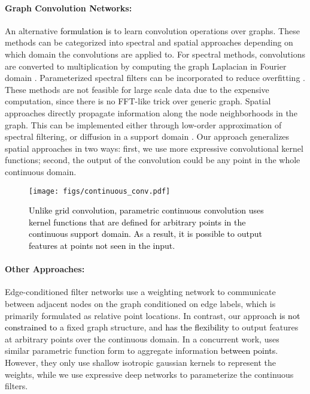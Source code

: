 \documentclass[10pt,twocolumn,letterpaper]{article}
\newcommand\shenlong[1]{\textcolor{black}{#1}}
\newcommand\simon[1]{\textcolor{black}{#1}}
\begin{document}
\paragraph{Graph Convolution Networks:} An alternative \simon{formulation is} to learn convolution operations over graphs.  These methods  can be categorized into spectral  and spatial approaches depending on which domain the convolutions are applied to.  For spectral methods, convolutions are converted to multiplication by computing the  graph Laplacian in Fourier domain \cite{spectralnn, anisotropic-cnn, syncspeccnn}. Parameterized spectral filters can be incorporated to reduce overfitting \cite{spectralnn}. These methods are not feasible for large scale data due to the expensive computation, since there is no FFT-like trick over generic graph.  Spatial approaches directly propagate information along the node neighborhoods in the graph. This can be implemented either through low-order approximation of spectral filtering\cite{chebnet, gcn, cnn-graph-hash}, or diffusion in a support domain \cite{monet, anisotropic-cnn, ecc, syncspeccnn, schnet}. Our approach  generalizes spatial approaches  in two ways: first, we use more expressive convolutional kernel functions; second, the output of the convolution could be any point in the whole continuous domain.

\begin{figure}
  \texttt{[image: figs/continuous\_conv.pdf]}
  \vspace{-3mm}
  \caption{\simon{Unlike grid convolution, parametric continuous convolution uses kernel functions that are defined for arbitrary points in the continuous support domain. As a result, it is possible to output features at points not seen in the input.}}

  \label{fig:idea}
\end{figure}


\paragraph{Other Approaches:} Edge-conditioned filter networks \cite{ecc} use a weighting network to communicate between adjacent nodes on the graph \cite{dfn} conditioned on edge labels, which is primarily formulated as relative point locations. In contrast, our approach 
\simon{is not constrained to} a fixed graph structure, and 
\simon{has the flexibility} to output features at  arbitrary points over the continuous domain.  In a concurrent work,  \cite{schnet} uses similar parametric function form  to aggregate information \shenlong{between points}. However,  they only use shallow isotropic gaussian kernels to represent the weights, while we use expressive deep networks to parameterize the continuous filters. 
 
\end{document}
